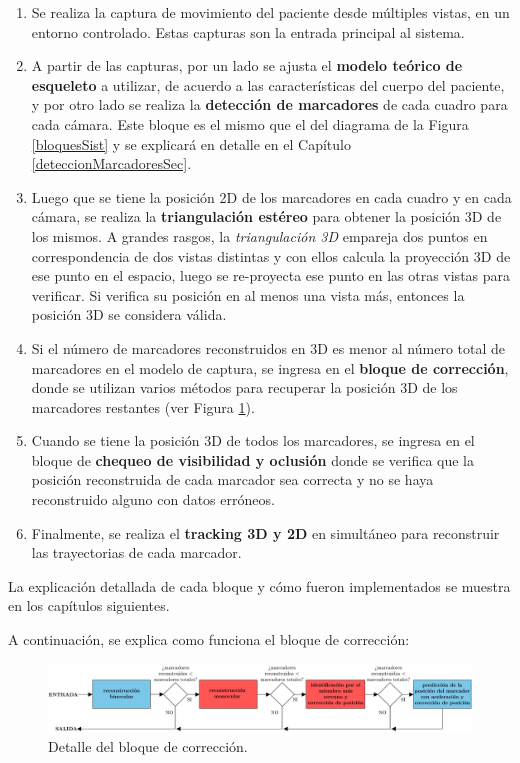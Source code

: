 \begin{enumerate}
\item Se realiza la captura de movimiento del paciente desde múltiples vistas, en un entorno controlado. Estas capturas son la entrada principal al sistema.
\item A partir de las capturas, por un lado se ajusta el \textbf{modelo teórico de esqueleto} a utilizar, de acuerdo a las características del cuerpo del paciente, y por otro lado se realiza la \textbf{detección de marcadores} de cada cuadro para cada cámara. Este bloque es el mismo que el del diagrama de la Figura \ref{bloquesSist} y se explicará en detalle en el Capítulo \ref{deteccionMarcadoresSec}.
\item Luego que se tiene la posición 2D de los marcadores en cada cuadro y en cada cámara, se realiza la \textbf{triangulación estéreo} para obtener la posición 3D de los mismos. A grandes rasgos, la \emph{triangulación 3D} empareja dos puntos en correspondencia de dos vistas distintas y con ellos calcula la proyección 3D de ese punto en el espacio, luego se re-proyecta ese punto en las otras vistas para verificar. Si verifica su posición en al menos una vista más, entonces la posición 3D se considera válida.
\item Si el número de marcadores reconstruidos en 3D es menor al número total de marcadores en el modelo de captura, se ingresa en el \textbf{bloque de corrección}, donde se utilizan varios métodos para recuperar la posición 3D de los marcadores restantes (ver Figura \ref{fig:bloqCorr}). 
\item Cuando se tiene la posición 3D de todos los marcadores, se ingresa en el bloque de \textbf{chequeo de visibilidad y oclusión} donde se verifica que la posición reconstruida de cada marcador sea correcta y no se haya reconstruido alguno con datos erróneos.
\item Finalmente, se realiza el \textbf{tracking 3D y 2D} en simultáneo para reconstruir las trayectorias de cada marcador.
\end{enumerate}

La explicación detallada de cada bloque y cómo fueron implementados se muestra en los capítulos siguientes.

A continuación, se explica como funciona el bloque de corrección:

\begin{figure}[ht!]
\hspace{-1cm}
\includegraphics[scale=0.22]{img/Sistema_completo/BloquesDeCorreccion}
\caption{Detalle del bloque de corrección.}
\label{fig:bloqCorr}
\end{figure}

